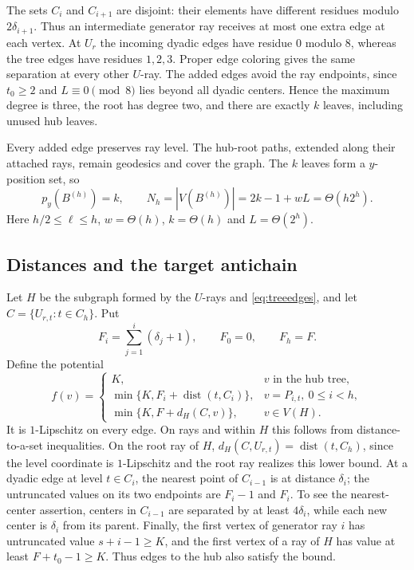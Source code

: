 \documentclass[11pt]{article}
\theoremstyle{remark}\newtheorem{remark}[theorem]{Remark}
\newcommand{\dist}{\operatorname{dist}}
\begin{document}
The sets $C_i$ and $C_{i+1}$ are disjoint: their elements have different
residues modulo $2\delta_{i+1}$. Thus an intermediate generator ray receives
at most one extra edge at each vertex. At $U_r$ the incoming dyadic edges
have residue $0$ modulo $8$, whereas the tree edges have residues $1,2,3$.
Proper edge coloring gives the same separation at every other $U$-ray.
The added edges avoid the ray endpoints, since $t_0\ge2$ and $L\equiv0\pmod8$
lies beyond all dyadic centers. Hence the maximum degree is three, the root
has degree two, and there are exactly $k$ leaves, including unused hub leaves.

Every added edge preserves ray level. The hub-root paths, extended along
their attached rays, remain geodesics and cover the graph. The $k$ leaves
form a $y$-position set, so
\begin{equation}\label{eq:baseorder}
 p_y(B^{(h)})=k,\qquad N_h=|V(B^{(h)})|=2k-1+wL=\Theta(h2^h).
\end{equation}
Here $h/2\le\ell\le h$, $w=\Theta(h)$, $k=\Theta(h)$ and $L=\Theta(2^h)$.

\subsection{Distances and the target antichain}
Let $H$ be the subgraph formed by the $U$-rays and
\eqref{eq:treeedges}, and let $C=\{U_{r,t}:t\in C_h\}$. Put
\[
 F_i=\sum_{j=1}^i(\delta_j+1),\qquad F_0=0,\qquad F_h=F.
\]
Define the potential
\begin{equation}\label{eq:potential}
 f(v)=
 \begin{cases}
 K,&v\text{ in the hub tree},\\
 \min\{K,F_i+\dist(t,C_i)\},&v=P_{i,t},\ 0\le i<h,\\
 \min\{K,F+d_H(C,v)\},&v\in V(H).
 \end{cases}
\end{equation}
It is $1$-Lipschitz on every edge. On rays and within $H$ this follows from
distance-to-a-set inequalities. On the root ray of $H$,
$d_H(C,U_{r,t})=\dist(t,C_h)$, since the level coordinate is $1$-Lipschitz
and the root ray realizes this lower bound. At a dyadic edge at level
$t\in C_i$, the nearest point of $C_{i-1}$ is at distance $\delta_i$;
the untruncated values on its two endpoints are $F_i-1$ and $F_i$.
To see the nearest-center assertion, centers in $C_{i-1}$ are separated
by at least $4\delta_i$, while each new center is $\delta_i$ from its parent.
Finally, the first vertex of generator ray $i$ has untruncated value
$s+i-1\ge K$, and the first vertex of a ray of $H$ has value at least
$F+t_0-1\ge K$. Thus edges to the hub also satisfy the bound.
\end{document}
